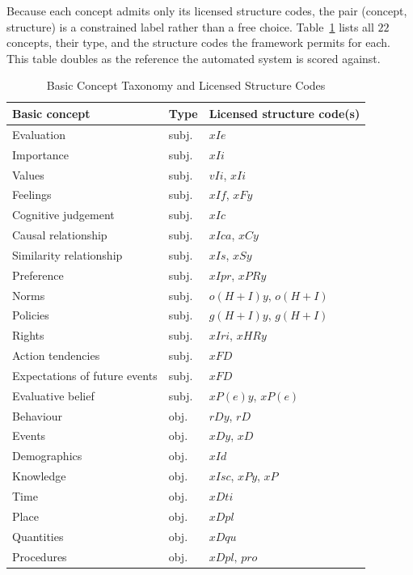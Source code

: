 \documentclass[onecolumn, 11pt]{IEEEtran}
\begin{document}
Because each concept admits only its licensed structure codes, the pair (concept, structure) is a constrained label rather than a free choice. Table~\ref{tab:taxonomy} lists all $22$ concepts, their type, and the structure codes the framework permits for each. This table doubles as the reference the automated system is scored against.

\begin{table}[t]
\caption{Basic Concept Taxonomy and Licensed Structure Codes}
\label{tab:taxonomy}
\centering
\footnotesize
\begin{tabular}{l l l}
\hline
\textbf{Basic concept} & \textbf{Type} & \textbf{Licensed structure code(s)} \\
\hline
Evaluation & subj. & $xIe$ \\
Importance & subj. & $xIi$ \\
Values & subj. & $vIi$, $xIi$ \\
Feelings & subj. & $xIf$, $xFy$ \\
Cognitive judgement & subj. & $xIc$ \\
Causal relationship & subj. & $xIca$, $xCy$ \\
Similarity relationship & subj. & $xIs$, $xSy$ \\
Preference & subj. & $xIpr$, $xPRy$ \\
Norms & subj. & $o(H{+}I)y$, $o(H{+}I)$ \\
Policies & subj. & $g(H{+}I)y$, $g(H{+}I)$ \\
Rights & subj. & $xIri$, $xHRy$ \\
Action tendencies & subj. & $xFD$ \\
Expectations of future events & subj. & $xFD$ \\
Evaluative belief & subj. & $xP(e)y$, $xP(e)$ \\
\hline
Behaviour & obj. & $rDy$, $rD$ \\
Events & obj. & $xDy$, $xD$ \\
Demographics & obj. & $xId$ \\
Knowledge & obj. & $xIsc$, $xPy$, $xP$ \\
Time & obj. & $xDti$ \\
Place & obj. & $xDpl$ \\
Quantities & obj. & $xDqu$ \\
Procedures & obj. & $xDpl,\,pro$\footnotemark[1] \\
\hline
\end{tabular}
\end{table}
\end{document}
